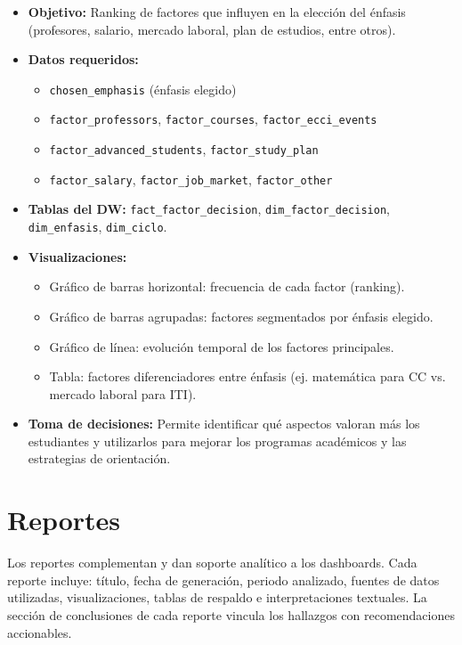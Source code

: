 \documentclass[12pt, letterpaper]{article}
\begin{document}
\begin{itemize}
  \item \textbf{Objetivo:} Ranking de factores que influyen en la elección del énfasis (profesores, salario, mercado laboral, plan de estudios, entre otros).
  \item \textbf{Datos requeridos:}
  \begin{itemize}
    \item \texttt{chosen\_emphasis} (énfasis elegido)
    \item \texttt{factor\_professors}, \texttt{factor\_courses}, \texttt{factor\_ecci\_events}
    \item \texttt{factor\_advanced\_students}, \texttt{factor\_study\_plan}
    \item \texttt{factor\_salary}, \texttt{factor\_job\_market}, \texttt{factor\_other}
  \end{itemize}
  \item \textbf{Tablas del DW:} \texttt{fact\_factor\_decision}, \texttt{dim\_factor\_decision}, \texttt{dim\_enfasis}, \texttt{dim\_ciclo}.
  \item \textbf{Visualizaciones:}
  \begin{itemize}
    \item Gráfico de barras horizontal: frecuencia de cada factor (ranking).
    \item Gráfico de barras agrupadas: factores segmentados por énfasis elegido.
    \item Gráfico de línea: evolución temporal de los factores principales.
    \item Tabla: factores diferenciadores entre énfasis (ej. matemática para CC vs. mercado laboral para ITI).
  \end{itemize}
  \item \textbf{Toma de decisiones:} Permite identificar qué aspectos valoran más los estudiantes y utilizarlos para mejorar los programas académicos y las estrategias de orientación.
\end{itemize}

\section{Reportes}

Los reportes complementan y dan soporte analítico a los dashboards. Cada reporte incluye: título, fecha de generación, periodo analizado, fuentes de datos utilizadas, visualizaciones, tablas de respaldo e interpretaciones textuales. La sección de conclusiones de cada reporte vincula los hallazgos con recomendaciones accionables.
\end{document}

